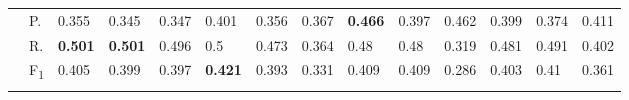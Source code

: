 \begin{tabularx}{\textwidth}{p{1.3em}l Z  Z  Z  Z  Z  Z  Z  Z  Z  Z  Z  Z }
    & P.    & 0.355    & 0.345    & 0.347    & 0.401    & 0.356    & 0.367    & \textbf{ 0.466 }    & 0.397    & 0.462    & 0.399    & 0.374    & 0.411 \\
    & R.    & \textbf{ 0.501 }    & \textbf{ 0.501 }    & 0.496    & 0.5    & 0.473    & 0.364    & 0.48    & 0.48    & 0.319    & 0.481    & 0.491    & 0.402 \\
    & F\textsubscript{1}    & 0.405    & 0.399    & 0.397    & \textbf{ 0.421 }    & 0.393    & 0.331    & 0.409    & 0.409    & 0.286    & 0.403    & 0.41    & 0.361 \\
     \midrule {}

\end{tabularx}